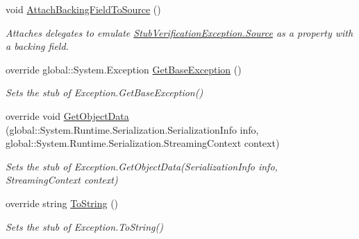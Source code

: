 \begin{DoxyCompactItemize}
void \hyperlink{class_system_1_1_security_1_1_fakes_1_1_stub_verification_exception_a0eb9885cf2dcc992cc3f5c7c6122dc42}{Attach\-Backing\-Field\-To\-Source} ()
\begin{DoxyCompactList}\small\item\em Attaches delegates to emulate \hyperlink{class_system_1_1_security_1_1_fakes_1_1_stub_verification_exception_a7ce5943c9265918e5ab2b65a3f3fbd2f}{Stub\-Verification\-Exception.\-Source} as a property with a backing field.\end{DoxyCompactList}\item 
override global\-::\-System.\-Exception \hyperlink{class_system_1_1_security_1_1_fakes_1_1_stub_verification_exception_ae79bd0641d847de8b7001b5440e2153e}{Get\-Base\-Exception} ()
\begin{DoxyCompactList}\small\item\em Sets the stub of Exception.\-Get\-Base\-Exception()\end{DoxyCompactList}\item 
override void \hyperlink{class_system_1_1_security_1_1_fakes_1_1_stub_verification_exception_aaf6c7c2f23144b897f09d651e912a9fe}{Get\-Object\-Data} (global\-::\-System.\-Runtime.\-Serialization.\-Serialization\-Info info, global\-::\-System.\-Runtime.\-Serialization.\-Streaming\-Context context)
\begin{DoxyCompactList}\small\item\em Sets the stub of Exception.\-Get\-Object\-Data(\-Serialization\-Info info, Streaming\-Context context)\end{DoxyCompactList}\item 
override string \hyperlink{class_system_1_1_security_1_1_fakes_1_1_stub_verification_exception_a0d4c6751b8de64850066ed1dda0f99ef}{To\-String} ()
\begin{DoxyCompactList}\small\item\em Sets the stub of Exception.\-To\-String()\end{DoxyCompactList}\end{DoxyCompactItemize}
